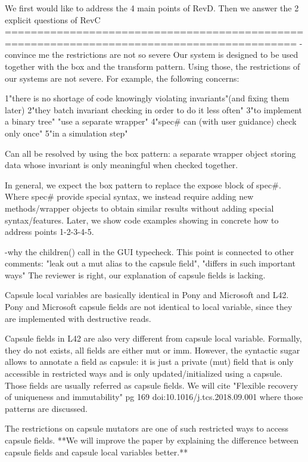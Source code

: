  We first would like to address the 4 main points of RevD.
Then we answer the 2 explicit questions of RevC
===========================================================================================
-convince me the restrictions are not so severe
Our system is designed to be used together with the box and the transform pattern.
Using those, the restrictions of our systems are not severe.
For example, the following concerns:

1"there is no shortage of code knowingly violating invariants"(and fixing them later)
2"they batch invariant checking in order to do it less often"
3"to implement a binary tree" "use a separate wrapper"
4"spec# can (with user guidance) check only once"
5"in a simulation step"

Can all be resolved by using the box pattern: a separate wrapper object storing data
whose invariant is only meaningful when checked together.

In general, we expect the box pattern to replace the expose block of spec#.
Where spec# provide special syntax, we instead require adding new methods/wrapper
objects to obtain similar results without adding special syntax/features.
Later, we show code examples showing in concrete how to address points 1-2-3-4-5.

-why the children() call in the GUI typecheck.
This point is connected to other comments:
 "leak out a mut alias to the capsule field", "differs in such important ways"
The reviewer is right, our explanation of capsule fields is lacking.

Capsule local variables are basically identical in Pony and Microsoft and L42.
Pony and Microsoft capsule fields are not identical to local variable, since they are 
implemented with destructive reads.

Capsule fields in L42 are also very different from capsule local variable.
Formally, they do not exists, all fields are either mut or imm.
However, the syntactic sugar allows to annotate a field as capsule:
it is just a private (mut) field that is only
accessible in restricted ways and is only updated/initialized using a capsule.
Those fields are usually referred as capsule fields.
We will cite "Flexible recovery of uniqueness and immutability" 
pg 169 doi:10.1016/j.tcs.2018.09.001 where those patterns are discussed.

The restrictions on capsule mutators are one of such restricted ways to access capsule fields.
**We will improve the paper by explaining the difference between capsule fields and capsule 
local variables better.**

